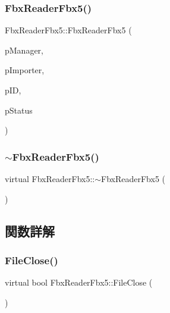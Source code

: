 \subsubsection{\texorpdfstring{Fbx\+Reader\+Fbx5()}{FbxReaderFbx5()}}
{\footnotesize\ttfamily Fbx\+Reader\+Fbx5\+::\+Fbx\+Reader\+Fbx5 (\begin{DoxyParamCaption}\item[{\hyperlink{class_fbx_manager}{Fbx\+Manager} \&}]{p\+Manager,  }\item[{\hyperlink{class_fbx_importer}{Fbx\+Importer} \&}]{p\+Importer,  }\item[{int}]{p\+ID,  }\item[{\hyperlink{class_fbx_status}{Fbx\+Status} \&}]{p\+Status }\end{DoxyParamCaption})}

\mbox{\label{class_fbx_reader_fbx5_ae1ebf6def0485de077076b8e18435eb6}} 
\subsubsection{\texorpdfstring{$\sim$\+Fbx\+Reader\+Fbx5()}{~FbxReaderFbx5()}}
{\footnotesize\ttfamily virtual Fbx\+Reader\+Fbx5\+::$\sim$\+Fbx\+Reader\+Fbx5 (\begin{DoxyParamCaption}{ }\end{DoxyParamCaption})\hspace{0.3cm}{\ttfamily [virtual]}}



\subsection{関数詳解}
\mbox{\label{class_fbx_reader_fbx5_a315730ff4083066964d32c6d3b3a717d}} 
\subsubsection{\texorpdfstring{File\+Close()}{FileClose()}}
{\footnotesize\ttfamily virtual bool Fbx\+Reader\+Fbx5\+::\+File\+Close (\begin{DoxyParamCaption}{ }\end{DoxyParamCaption})\hspace{0.3cm}{\ttfamily [virtual]}}

